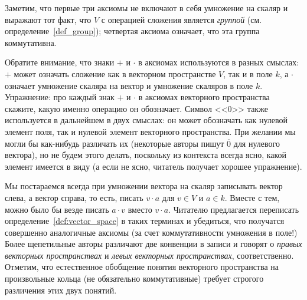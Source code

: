\begin{remark}
Заметим, что первые три аксиомы не включают в себя умножение на скаляр
и выражают тот факт, что $V$ с операцией сложения является {\em
  группой} (см. определение~\ref{def_group}); четвертая аксиома
означает, что эта группа коммутативна.
\end{remark}
\begin{remark}
Обратите внимание, что знаки $+$ и $\cdot$ в аксиомах используются в
разных смыслах: $+$ может означать сложение как в векторном
пространстве $V$, так и в поле $k$, а $\cdot$ означает умножение
скаляра на вектор и умножение скаляров в поле $k$. Упражнение:
про каждый знак $+$ и $\cdot$ в аксиомах векторного пространства
скажите, какую именно операцию он обозначает.
Символ <<$0$>> также используется в дальнейшем в двух смыслах: он может
обозначать как нулевой элемент поля, так и нулевой элемент векторного
пространства. При желании мы могли бы как-нибудь различать их (некоторые
авторы пишут $\overline{0}$ для нулевого вектора), но
не будем этого делать, поскольку из контекста всегда ясно, какой
элемент имеется в виду (а если не ясно, читатель получает
хорошее упражнение).
\end{remark}
\begin{remark}
Мы постараемся всегда при умножении вектора на скаляр записывать
вектор слева, а вектор справа, то есть, писать $v\cdot a$ для $v\in V$
и $a\in k$. Вместе с тем, можно было бы везде писать $a\cdot v$
вместо $v\cdot a$. Читателю предлагается переписать
определение~\ref{def:vector_space} в таких терминах и убедиться, что
получатся совершенно аналогичные аксиомы (за счет коммутативности
умножения в поле!) Более щепетильные авторы различают две конвенции
в записи и говорят о {\em правых векторных пространствах}
и {\em левых векторных пространствах}, соответственно.
Отметим, что естественное обобщение понятия векторного пространства
на произвольные кольца (не обязательно коммутативные) требует
строгого различения этих двух понятий.
\end{remark}

